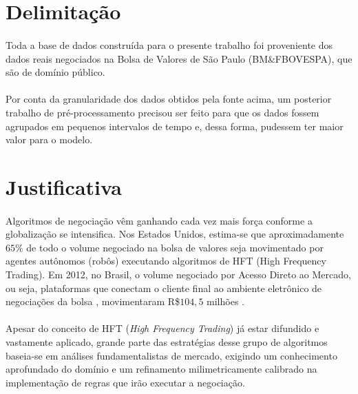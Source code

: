 \documentclass[grad,numbers]{coppe}
\begin{document}
  \section{Delimitação}

    \paragraph{}Toda a base de dados construída para o presente trabalho foi proveniente dos dados reais negociados na Bolsa de Valores de São Paulo (BM\&FBOVESPA), que são de domínio público. 
    
    \paragraph{}Por conta da granularidade dos dados obtidos pela fonte acima, um posterior trabalho de pré-processamento precisou ser feito para que os dados fossem agrupados em pequenos intervalos de tempo e, dessa forma, pudessem ter maior valor para o modelo.
  
  \section{Justificativa}
  
    \paragraph{}Algoritmos de negociação vêm ganhando cada vez mais força conforme a globalização se intensifica. Nos Estados Unidos, estima-se que aproximadamente ${65\%}$ de todo o volume negociado na bolsa de valores seja movimentado por agentes autônomos (robôs) executando algoritmos de HFT (High Frequency Trading). Em 2012, no Brasil, o volume negociado por Acesso Direto ao Mercado, ou seja, plataformas que conectam o cliente final ao ambiente eletrônico de negociações da bolsa \cite{parceiros-dma}, movimentaram R\$$104,5$ milhões \cite{moreno-hft}. 
  
    \paragraph{}Apesar do conceito de HFT (\textit{High Frequency Trading}) já estar difundido e vastamente aplicado, grande parte das estratégias desse grupo de algoritmos baseia-se em análises fundamentalistas de mercado, exigindo um conhecimento aprofundado do domínio e um refinamento milimetricamente calibrado na implementação de regras que irão executar a negociação. 
    
\end{document}
